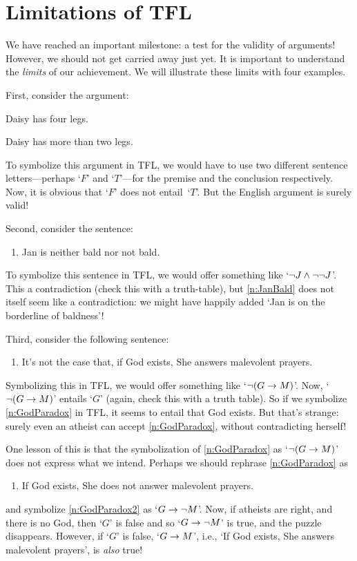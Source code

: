 \chapter{Limitations of TFL}\label{s:ParadoxesOfMaterialConditional}

We have reached an important milestone: a test for the validity of
arguments! However, we should not get carried away just yet. It is
important to understand the \emph{limits} of our achievement. We will
illustrate these limits with four examples.

First, consider the argument: 
	\begin{earg}
		\item Daisy has four legs.
		\item[\texttherefore] Daisy has more than two legs.
	\end{earg}
To symbolize this argument in TFL, we would have to use two different sentence letters---perhaps `$F$'  and `$T$'---for the premise and the conclusion respectively. Now, it is obvious that `$F$' does not entail~`$T$'. But the English argument is surely valid!

Second, consider the sentence:
	\begin{enumerate}
		\item\label{n:JanBald} Jan is neither bald nor not bald.
	\end{enumerate}
To symbolize this sentence in TFL, we would offer something like
`$\neg J \wedge \neg \neg J$'. This a contradiction (check this with
a truth-table), but \cref*{n:JanBald} does not itself seem like a
contradiction: we might have happily added `Jan is on the borderline
of baldness'!

Third, consider the following sentence:
	\begin{enumerate}
	\item\label{n:GodParadox} It's not the case that, if God exists, She answers malevolent prayers.
	\end{enumerate}
Symbolizing this in TFL, we would offer something like `$\neg (G \rightarrow M)$'. Now, `$\neg (G \rightarrow M)$' entails `$G$' (again, check this with a truth table). So if we symbolize \cref*{n:GodParadox} in TFL, it seems to entail that God exists. But that's strange: surely even an atheist can accept \cref*{n:GodParadox}, without contradicting herself!

One lesson of this is that the symbolization of \cref*{n:GodParadox} as `$\neg(G \rightarrow M)$' does not express what we intend. Perhaps we should rephrase \cref*{n:GodParadox} as
	\begin{enumerate}
	\item\label{n:GodParadox2} If God exists, She does not answer malevolent prayers.
	\end{enumerate}
and symbolize \cref*{n:GodParadox2} as `$G \rightarrow \neg M$'.  Now, if atheists are right, and there is no God, then `$G$' is false and so `$G \rightarrow \neg M$' is true, and the puzzle disappears. However, if `$G$' is false, `$G \rightarrow M$', i.e., `If God exists, She answers malevolent prayers', is \emph{also} true!

